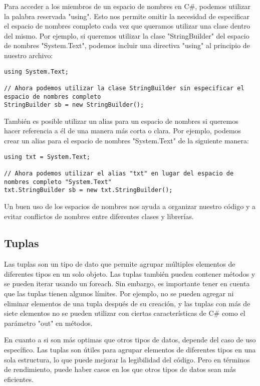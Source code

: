 \documentclass[executivepaper]{article}
\begin{document}
Para acceder a los miembros de un espacio de nombres en C\#, podemos utilizar la palabra reservada "using". Esto nos permite omitir la necesidad de especificar el espacio de nombres completo cada vez que queramos utilizar una clase dentro del mismo. Por ejemplo, si queremos utilizar la clase "StringBuilder" del espacio de nombres "System.Text", podemos incluir una directiva "using" al principio de nuestro archivo:

\begin{lstlisting}
using System.Text;

// Ahora podemos utilizar la clase StringBuilder sin especificar el espacio de nombres completo
StringBuilder sb = new StringBuilder();
\end{lstlisting}

También es posible utilizar un alias para un espacio de nombres si queremos hacer referencia a él de una manera más corta o clara. Por ejemplo, podemos crear un alias para el espacio de nombres "System.Text" de la siguiente manera:

\begin{lstlisting}
using txt = System.Text;

// Ahora podemos utilizar el alias "txt" en lugar del espacio de nombres completo "System.Text"
txt.StringBuilder sb = new txt.StringBuilder();
\end{lstlisting}

Un buen uso de los espacios de nombres nos ayuda a organizar nuestro código y a evitar conflictos de nombres entre diferentes clases y librerías.

\subsection{Tuplas}

Las tuplas son un tipo de dato que permite agrupar múltiples elementos de diferentes tipos en un solo objeto. Las tuplas también pueden contener métodos y se pueden iterar usando un foreach. Sin embargo, es importante tener en cuenta que las tuplas tienen algunos límites. Por ejemplo, no se pueden agregar ni eliminar elementos de una tupla después de su creación, y las tuplas con más de siete elementos no se pueden utilizar con ciertas características de C\# como el parámetro "out" en métodos.

En cuanto a si son más optimas que otros tipos de datos, depende del caso de uso específico. Las tuplas son útiles para agrupar elementos de diferentes tipos en una sola estructura, lo que puede mejorar la legibilidad del código. Pero en términos de rendimiento, puede haber casos en los que otros tipos de datos sean más eficientes.
\end{document}
